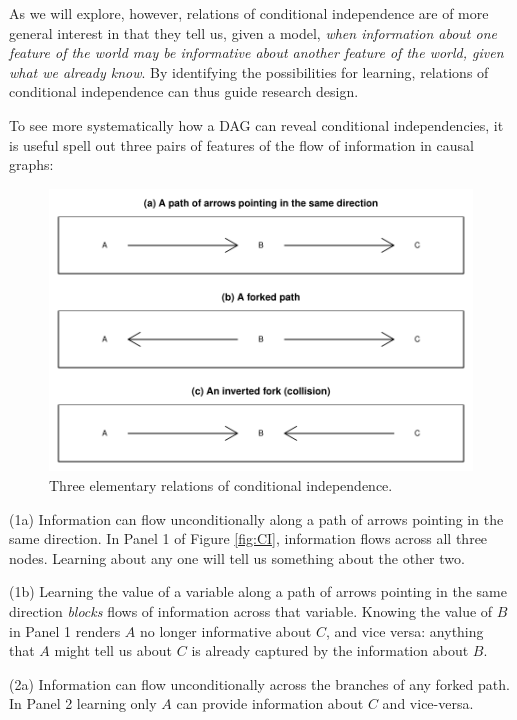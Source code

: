 \documentclass[
  12pt,
]{book}
\begin{document}
As we will explore, however, relations of conditional independence are of more general interest in that they tell us, given a model, \emph{when information about one feature of the world may be informative about another feature of the world, given what we already know}. By identifying the possibilities for learning, relations of conditional independence can thus guide research design.

To see more systematically how a DAG can reveal conditional independencies, it is useful spell out three pairs of features of the flow of information in causal graphs:

\begin{figure}

{\centering \includegraphics[width=.9\textwidth]{ii_files/figure-latex/pathsexp-1} 

}

\caption{\label{fig:CI} Three elementary relations of conditional independence.}\label{fig:pathsexp}
\end{figure}

(1a) Information can flow unconditionally along a path of arrows pointing in the same direction. In Panel 1 of Figure \ref{fig:CI}, information flows across all three nodes. Learning about any one will tell us something about the other two.

(1b) Learning the value of a variable along a path of arrows pointing in the same direction \emph{blocks} flows of information across that variable. Knowing the value of \(B\) in Panel 1 renders \(A\) no longer informative about \(C\), and vice versa: anything that \(A\) might tell us about \(C\) is already captured by the information about \(B\).

(2a) Information can flow unconditionally across the branches of any forked path. In Panel 2 learning only \(A\) can provide information about \(C\) and vice-versa.
\end{document}
